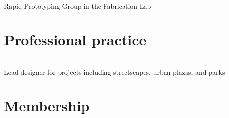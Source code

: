 \documentclass[]{baharmon_cv}
\begin{document}
{{{{{Rapid Prototyping Group in the Fabrication Lab

\sectiondivider


\section{Professional practice}
\begin{minipage}[t]{0.80\textwidth} 
\end{minipage}
\begin{minipage}[t]{0.20\textwidth} 
\end{minipage}\\
Lead designer for projects including streetscapes, urban plazas, and parks



\section{Membership}
\begin{minipage}[t]{0.80\textwidth} 
\end{minipage}
\begin{minipage}[t]{0.20\textwidth} 
\end{minipage}
\\

\begin{minipage}[t]{0.80\textwidth} 
\end{minipage}
\begin{minipage}[t]{0.20\textwidth} 
\end{minipage}
\\

\begin{minipage}[t]{0.80\textwidth} 
\end{minipage}
\begin{minipage}[t]{0.20\textwidth} 
\end{minipage}
\\

}}}}}
\end{document}
